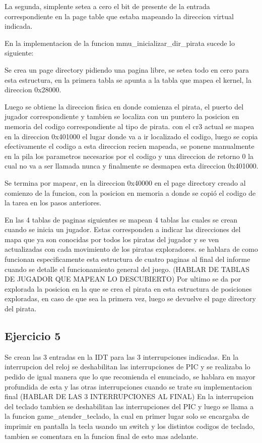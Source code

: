 La segunda, simplente setea a cero el bit de presente de la entrada correspondiente en la page table que estaba mapeando la direccion
virtual indicada.

En la implementacion de la funcion mmu_inicializar_dir_pirata sucede lo siguiente:

Se crea un page directory pidiendo una pagina libre, se setea todo en cero para esta estructura,
en la primera tabla se apunta a la tabla que mapea el kernel, la direccion 0x28000.

Luego se obtiene la direccion fisica en donde comienza el pirata, el puerto del jugador correspondiente y
tambien se localiza con un puntero la posicion en memoria del codigo correspondiente al tipo de pirata.
con el cr3 actual se mapea en la direccion 0x401000 el lugar donde va a ir localizado el codigo,
luego se copia efectivamente el codigo a esta direccion recien mapeada, se ponene manualmente en la pila
los parametros necesarios por el codigo y una direccion de retorno 0 la cual no va a ser llamada nunca y
finalmente se desmapea esta direccion 0x401000.

Se termina por mapear, en la direccion 0x40000 en el page directory creado al comienzo de la funcion, con
la posicion en memoria a donde se copió el codigo de la tarea en los pasos anteriores.

En las 4 tablas de paginas siguientes se mapean 4 tablas las cuales se crean cuando se inicia un jugador.
Estas corresponden a indicar las direcciones del mapa que ya son conocidas por todos los piratas del jugador
y se ven actualizadas con cada movimiento de los piratas exploradores. se hablara de como funcionan especificamente
esta estructura de cuatro paginas al final del informe cuando se detalle el funcionamiento general del juego.   (HABLAR DE TABLAS DE JUGADOR QUE MAPEAN LO DESCUBIERTO)
Por ultimo se da por explorada la posicion en la que se crea el pirata en esta estructura de posiciones exploradas,
en caso de que sea la primera vez, luego se devuelve el page directory del pirata.


\subsection{Ejercicio 5}

Se crean las 3 entradas en la IDT para las 3 interrupciones indicadas.
En la interrupcion del reloj se deshabilitan las interrupciones de PIC
y se realizaba lo pedido de igual manera que lo que recomienda el enunciado, se hablara
en mayor profundida de esta y las otras interrupciones cuando se trate su implementacion final                            (HABLAR DE LAS 3 INTERRUPCIONES AL FINAL)
En la interrupcion del teclado tambien se deshabilitan las interrupciones del PIC y luego se llama a
la funcion game_atender_teclado, la cual en primer lugar solo se encargaba de imprimir en pantalla la tecla
usando un switch y los distintos codigos de teclado, tambien se comentara en la funcion final de esto mas adelante.

